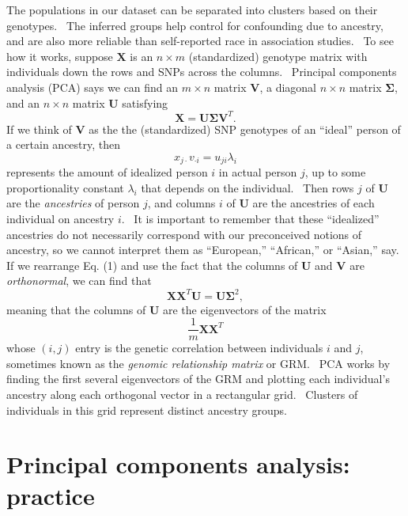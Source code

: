 \documentclass[
]{book}
\begin{document}
The populations in our dataset can be separated into clusters based on their genotypes.~ The inferred groups help control for confounding due to ancestry, and are also more reliable than self-reported race in association studies.~ To see how it works, suppose \(\mathbf{X}\) is an \(n\times m\) (standardized) genotype matrix with individuals down the rows and SNPs across the columns.~ Principal components analysis (PCA) says we can find an \(m\times n\) matrix \(\mathbf{V}\), a diagonal \(n\times n\) matrix \(\mathbf{\Sigma}\), and an \(n\times n\) matrix \(\mathbf{U}\) satisfying \begin{equation}\mathbf{X}=\mathbf{U}\mathbf{\Sigma}\mathbf{V}^T.\tag{1}\end{equation} If we think of \(\mathbf{V}\) as the the (standardized) SNP genotypes of an ``ideal'' person of a certain ancestry, then \begin{equation}x_{j\cdot} v_{\cdot i}=u_{ji}\lambda_i\end{equation} represents the amount of idealized person \(i\) in actual person \(j\), up to some proportionality constant \(\lambda_i\) that depends on the individual.~ Then rows \(j\) of \(\mathbf{U}\) are the \emph{ancestries} of person \(j\), and columns \(i\) of \(\mathbf{U}\) are the ancestries of each individual on ancestry \(i\).~ It is important to remember that these ``idealized'' ancestries do not necessarily correspond with our preconceived notions of ancestry, so we cannot interpret them as ``European,'' ``African,'' or ``Asian,'' say.~ If we rearrange Eq. (1) and use the fact that the columns of \(\mathbf{U}\) and \(\mathbf{V}\) are \emph{orthonormal}, we can find that \begin{equation}\mathbf{X}\mathbf{X}^T\mathbf{U}=\mathbf{U}\mathbf{\Sigma}^2,\end{equation} meaning that the columns of \(\mathbf{U}\) are the eigenvectors of the matrix \begin{equation}\frac{1}{m}\mathbf{X}\mathbf{X}^T\tag{2}\end{equation} whose \(\left(i,j\right)\) entry is the genetic correlation between individuals \(i\) and \(j\), sometimes known as the \emph{genomic relationship matrix} or GRM.~ PCA works by finding the first several eigenvectors of the GRM and plotting each individual's ancestry along each orthogonal vector in a rectangular grid.~ Clusters of individuals in this grid represent distinct ancestry groups.

\hypertarget{principal-components-analysis-practice}{%
\section{Principal components analysis: practice}\label{principal-components-analysis-practice}}
\end{document}
